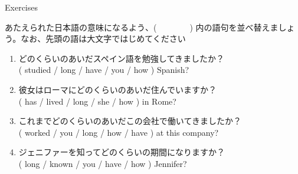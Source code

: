 \documentclass[aspectratio=169,xcolor={dvipsnames,table}]{beamer}
\newcommand{\myaudio}[1]{\href{#1}{\faVolumeUp}}
\begin{document}
\begin{frame}[plain]{Exercises}

あたえられた日本語の意味になるよう、(~~~~~~~~) 内の語句を並べ替えましょう。なお、先頭の語は大文字ではじめてください\mbox{}\hfill\myaudio{./audio/012_have_pp_keizoku_11.mp3}

\vspace{-5pt}

\begin{enumerate}
 \item どのくらいのあいだスペイン語を勉強してきましたか？\\
( studied / long / have / you / how ) Spanish?\\
 \item 彼女はローマにどのくらいのあいだ住んでいますか？\\
( has / lived / long / she / how ) in Rome?\\
 \item これまでどのくらいのあいだこの会社で働いてきましたか？\\
( worked /  you / long / how / have ) at this company?\\
 \item ジェニファーを知ってどのくらいの期間になりますか？\\
( long / known / you / have / how ) Jennifer?\\
\end{enumerate}
\end{frame}
\end{document}
